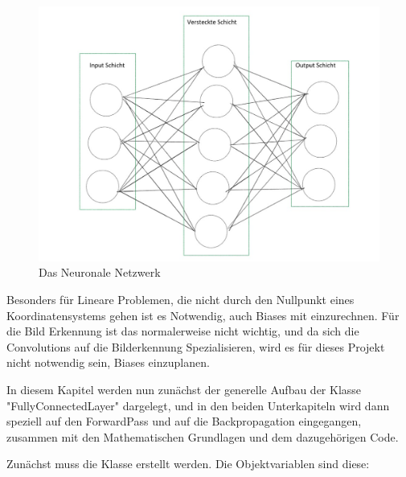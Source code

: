 \documentclass[12pt]{article}
\begin{document}
\begin{figure}[H]
\centering
\includegraphics[scale=0.50]{./Images/BA_002_FeedForwardNetzwerk.jpg}
\caption{Das Neuronale Netzwerk}
\label{Das Neuronale Netzwerk}
\end{figure}

Besonders für Lineare Problemen, die nicht durch den Nullpunkt eines Koordinatensystems gehen ist es Notwendig, auch Biases mit einzurechnen. Für die Bild Erkennung ist das normalerweise nicht wichtig, und da sich die Convolutions auf die Bilderkennung Spezialisieren, wird es für dieses Projekt nicht notwendig sein, Biases einzuplanen.

In diesem Kapitel werden nun zunächst der generelle Aufbau der Klasse "FullyConnectedLayer" dargelegt, und in den beiden Unterkapiteln wird dann speziell auf den ForwardPass und auf die Backpropagation eingegangen, zusammen mit den Mathematischen Grundlagen und dem dazugehörigen Code.

Zunächst muss die Klasse erstellt werden. Die Objektvariablen sind diese:
    
\end{document}
